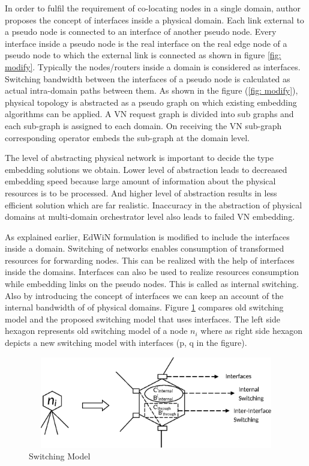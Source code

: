 \documentclass[article,dr=phil,type=msc ,colorback,accentcolor=tud4b]{tudthesis}
\begin{document}
In order to fulfil the requirement of co-locating nodes in a single domain, author proposes the concept of interfaces inside a physical domain. Each link external to a pseudo node is connected to an interface of another pseudo node. Every interface inside a pseudo node is the real interface on the real edge node of a pseudo node to which the external link is connected as shown in figure \ref{fig: modify}. Typically the nodes/routers inside a domain is considered as interfaces. Switching bandwidth between the interfaces of a pseudo node is calculated as actual intra-domain paths between them. As shown in the figure (\ref{fig: modify}), physical topology is abstracted as a pseudo graph on which existing embedding algorithms can be applied. A VN request graph is divided into sub graphs and each sub-graph is assigned to each domain. On receiving the VN sub-graph corresponding operator embeds the sub-graph at the domain level. \newline

The level of abstracting physical network is important to decide the type embedding solutions we obtain. Lower level of abstraction leads to decreased embedding speed because large amount of information about the physical resources is to be processed. And higher level of abstraction results in less efficient solution which are far realistic. Inaccuracy in the abstraction of physical domains at multi-domain orchestrator level also leads to failed VN embedding.\newline

As explained earlier, EdWiN formulation is modified to include the interfaces inside a domain. Switching of networks enables consumption of transformed resources for forwarding nodes. This can be realized with the help of interfaces inside the domains. Interfaces can also be used to realize resources consumption while embedding links on the pseudo nodes. This is called as internal switching. Also by introducing the concept of interfaces we can keep an account of the internal bandwidth of of physical domains. Figure \ref{fig: sw_model} compares old switching model and the proposed switching model that uses interfaces. The left side hexagon represents old switching model of a node $n_{i}$ where as right side hexagon depicts a new switching model with interfaces (p, q in the figure). 
\begin{figure}[h]
	\centering
	\includegraphics[width=12cm, height=4cm]{sw_model}
	\caption{Switching Model}
	\label{fig: sw_model}
\end{figure}
\end{document}
